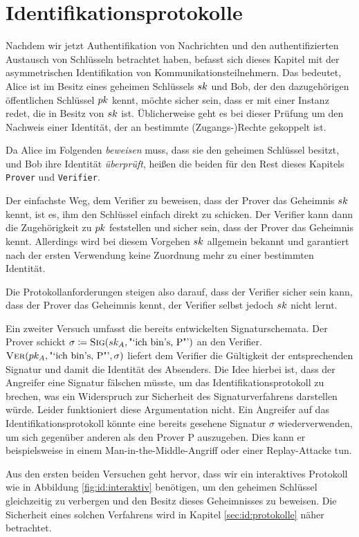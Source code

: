 \chapter{Identifikationsprotokolle} 
Nachdem wir jetzt Authentifikation von Nachrichten und den
authentifizierten Austausch von Schlüsseln betrachtet haben, befasst
sich dieses Kapitel mit der asymmetrischen Identifikation von
Kommunikationsteilnehmern. Das bedeutet, Alice ist im Besitz eines
geheimen Schlüssels $sk$ und Bob, der den dazugehörigen öffentlichen
Schlüssel $pk$ kennt, möchte sicher sein, dass er mit einer Instanz
redet, die in Besitz von $sk$ ist. Üblicherweise geht es bei dieser
Prüfung um den Nachweis einer Identität, der an bestimmte
(Zugangs-)Rechte gekoppelt ist.

Da Alice im Folgenden \emph{beweisen} muss, dass sie den geheimen
Schlüssel besitzt, und Bob ihre Identität \emph{überprüft}, heißen die
beiden für den Rest dieses Kapitels \texttt{Prover} und
\texttt{Verifier}\indexVerifier.

Der einfachste Weg, dem Verifier zu beweisen, dass der Prover das
Geheimnis $sk$ kennt, ist es, ihm den Schlüssel einfach direkt zu
schicken. Der Verifier kann dann die Zugehörigkeit zu $pk$
feststellen und sicher sein, dass der Prover das Geheimnis
kennt. Allerdings wird bei diesem Vorgehen $sk$ allgemein bekannt und
garantiert nach der ersten Verwendung keine Zuordnung mehr zu einer
bestimmten Identität.

Die Protokollanforderungen steigen also darauf, dass der Verifier sicher
sein kann, dass der Prover das Geheimnis kennt, der Verifier selbst
jedoch $sk$ nicht lernt.

Ein zweiter Versuch umfasst die bereits entwickelten
Signaturschemata. Der Prover schickt $\sigma \coloneqq \textsc{Sig}(sk_A,
\text{"`ich bin's, P"'})$ an den Verifier.  $\textsc{Ver}(pk_A,\text{"`ich
bin's, P"'}, \sigma)$ liefert dem Verifier die Gültigkeit der
entsprechenden Signatur und damit die Identität des Absenders. Die Idee
hierbei ist, dass der Angreifer eine Signatur fälschen müsste, um das
Identifikationsprotokoll zu brechen, was ein Widerspruch zur Sicherheit
des Signaturverfahrens darstellen würde. Leider funktioniert diese
Argumentation nicht. Ein Angreifer auf das Identifikationsprotokoll
könnte eine bereits gesehene Signatur $\sigma$ wiederverwenden, um sich
gegenüber anderen als den Prover P auszugeben. Dies kann er
beispielsweise in einem Man-in-the-Middle-Angriff oder einer
Replay-Attacke tun.

Aus den ersten beiden Versuchen geht hervor, dass wir ein interaktives
Protokoll wie in Abbildung \ref{fig:id:interaktiv} benötigen, um den
geheimen Schlüssel gleichzeitig zu verbergen und den Besitz dieses
Geheimnisses zu beweisen. Die Sicherheit eines solchen Verfahrens wird
in Kapitel \ref{sec:id:protokolle} näher betrachtet.

